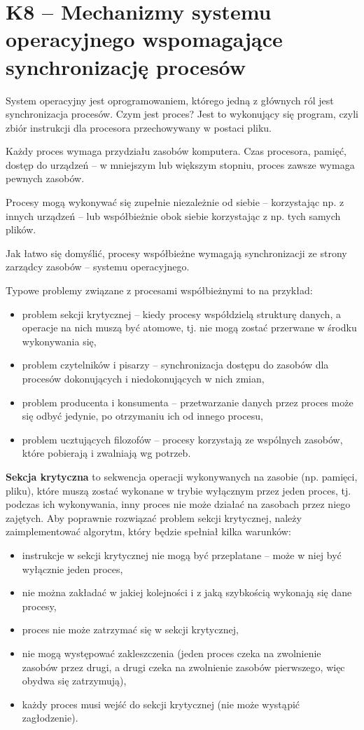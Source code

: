 \section{K8 -- Mechanizmy systemu operacyjnego wspomagające synchronizację procesów}

System operacyjny jest oprogramowaniem, którego jedną z głównych ról jest synchronizacja procesów.
Czym jest proces?
Jest to wykonujący się program, czyli zbiór instrukcji dla procesora przechowywany w postaci pliku.

Każdy proces wymaga przydziału zasobów komputera.
Czas procesora, pamięć, dostęp do urządzeń -- w mniejszym lub większym stopniu, proces zawsze wymaga pewnych zasobów.

Procesy mogą wykonywać się zupełnie niezależnie od siebie -- korzystając np. z innych urządzeń -- lub współbieżnie obok siebie korzystając z np. tych samych plików.

Jak łatwo się domyślić, procesy współbieżne wymagają synchronizacji ze strony zarządcy zasobów -- systemu operacyjnego.

Typowe problemy związane z procesami współbieżnymi to na przykład:
\begin{itemize}
	\setlength\itemsep{1pt}
	\item problem sekcji krytycznej -- kiedy procesy współdzielą strukturę danych, a operacje na nich muszą być atomowe, tj. nie mogą zostać przerwane w środku wykonywania się,
	\item problem czytelników i pisarzy -- synchronizacja dostępu do zasobów dla procesów dokonujących i niedokonujących w nich zmian,
	\item problem producenta i konsumenta -- przetwarzanie danych przez proces może się odbyć jedynie, po otrzymaniu ich od innego procesu,
	\item problem ucztujących filozofów -- procesy korzystają ze wspólnych zasobów, które pobierają i zwalniają wg potrzeb.
\end{itemize}

\textbf{Sekcja krytyczna} to sekwencja operacji wykonywanych na zasobie (np. pamięci, pliku), które muszą zostać wykonane w trybie wyłącznym przez jeden proces, tj. podczas ich wykonywania, inny proces nie może działać na zasobach przez niego zajętych.
Aby poprawnie rozwiązać problem sekcji krytycznej, należy zaimplementować algorytm, który będzie spełniał kilka warunków:
\begin{itemize}
	\setlength\itemsep{1pt}
	\item instrukcje w sekcji krytycznej nie mogą być przeplatane -- może w niej być wyłącznie jeden proces,
	\item nie można zakładać w jakiej kolejności i z jaką szybkością wykonają się dane procesy,
	\item proces nie może zatrzymać się w sekcji krytycznej,
	\item nie mogą występować zakleszczenia (jeden proces czeka na zwolnienie zasobów przez drugi, a drugi czeka na zwolnienie zasobów pierwszego, więc obydwa się zatrzymują),
	\item każdy proces musi wejść do sekcji krytycznej (nie może wystąpić zagłodzenie).
\end{itemize}

